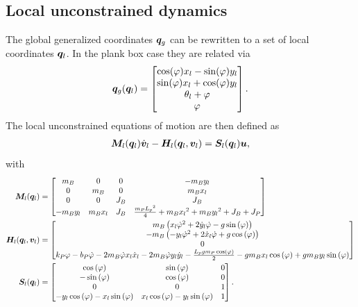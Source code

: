\documentclass[DC2017114Bouma.tex]{subfiles}
\begin{document}
\subsection*{Local unconstrained dynamics}
The global generalized coordinates ${\boldsymbol{q}}_g$ can be rewritten to a set of local coordinates ${\boldsymbol{q}}_l$. In the plank box case they are related via
\begin{equation}
{\boldsymbol{q}}_g({\boldsymbol{q}}_l) = \begin{bmatrix}
\cos(\varphi)x_l-\sin(\varphi)y_l\\
\sin(\varphi)x_l+\cos(\varphi)y_l\\
\theta_l+\varphi\\
\varphi
\end{bmatrix}.
\end{equation}
The local unconstrained equations of motion are then defined as
\begin{align}
{\boldsymbol{M}}_l({\boldsymbol{q}}_l)\dot{{\boldsymbol{v}}}_l - {\boldsymbol{H}}_l({\boldsymbol{q}}_l,{\boldsymbol{v}}_l) = {\boldsymbol{S}}_l({\boldsymbol{q}}_l){\boldsymbol{u}},
\end{align}
with
\begin{align}
{\boldsymbol{M}}_l({\boldsymbol{q}}_l) &= \begin{bmatrix}
m_B & 0 & 0 & -m_By_l\\ 0 & m_B & 0 & m_Bx_l\\ 0 & 0 & J_B & J_B\\ -m_By_l & m_Bx_l & J_B & \frac{m_P{L_p}^2}{4}+m_B{x_l}^2+m_B{y_l}^2+J_B+J_P
\end{bmatrix} \\
{\boldsymbol{H}}_l({\boldsymbol{q}}_l,{\boldsymbol{v}}_l) &= \begin{bmatrix}
m_B\left(x_l{\dot{\varphi}}^2+2\dot{y}_l\dot{\varphi}-g\sin\left(\varphi \right)\right)\\ -m_B\left(-y_l{\dot{\varphi}}^2+2\dot{x}_l\dot{\varphi}+g\cos\left(\varphi \right)\right)\\ 0\\ k_P\varphi -b_P\dot{\varphi}-2m_B\dot{\varphi}x_l\dot{x}_l-2m_B\dot{\varphi}y_l\dot{y}_l-\frac{L_pgm_P\cos\left(\varphi \right)}{2}-gm_Bx_l\cos\left(\varphi \right)+gm_By_l\sin\left(\varphi \right)
\end{bmatrix} \\
{\boldsymbol{S}}_l({\boldsymbol{q}}_l) &= \begin{bmatrix}
\cos\left(\varphi \right) & \sin\left(\varphi \right) & 0\\ -\sin\left(\varphi \right) & \cos\left(\varphi \right) & 0\\ 0 & 0 & 1\\ -y_l\cos\left(\varphi \right)-x_l\sin\left(\varphi \right) & x_l\cos\left(\varphi \right)-y_l\sin\left(\varphi \right) & 1
\end{bmatrix}.
\end{align}
\end{document}
